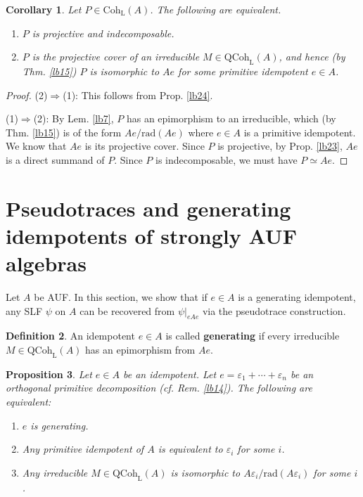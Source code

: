 \documentclass[11pt,b5paper,notitlepage]{article}
\theoremstyle{definition}
\newtheorem{df}{Definition}[section]
\theoremstyle{plain}
\newtheorem{pp}[df]{Proposition}
\newtheorem{co}[df]{Corollary}
\newcommand{\eps}{\varepsilon}
\newcommand{\QC}{\mathrm{QCoh}_{\mathrm L}}
\newcommand{\Coh}{\mathrm{Coh}_{\mathrm L}}
\newcommand{\rad}{\mathrm{rad}}
\numberwithin{equation}{section}
\begin{document}
\begin{co}\label{lb25}
Let $P\in\Coh(A)$. The following are equivalent.
\begin{enumerate}[label=(\arabic*)]
\item $P$ is projective and indecomposable.
\item $P$ is the projective cover of an irreducible $M\in\QC(A)$, and hence (by Thm. \ref{lb15}) $P$ is isomorphic to $Ae$ for some primitive idempotent $e\in A$.
\end{enumerate}
\end{co}


\begin{proof}
(2)$\Rightarrow$(1): This follows from Prop. \ref{lb24}.

(1)$\Rightarrow$(2): By Lem. \ref{lb7}, $P$ has an epimorphism to an irreducible, which (by Thm. \ref{lb15}) is of the form $Ae/\rad(Ae)$ where $e\in A$ is a primitive idempotent. We know that $Ae$ is its projective cover. Since $P$ is projective, by Prop. \ref{lb23}, $Ae$ is a direct summand of $P$. Since $P$ is indecomposable, we must have $P\simeq Ae$.
\end{proof}












\section{Pseudotraces and generating idempotents of strongly AUF algebras}

Let $A$ be AUF. In this section, we show that if $e\in A$ is a generating idempotent, any SLF $\psi$ on $A$ can be recovered from $\psi|_{eAe}$ via the pseudotrace construction. 

\begin{df}\label{lb28}
An idempotent $e\in A$ is called \textbf{generating} if every irreducible $M\in\QC(A)$ has an epimorphism from $Ae$.
\end{df}

\begin{pp}\label{lb16}
Let $e\in A$ be an idempotent. Let $e=\eps_1+\cdots+\eps_n$ be an orthogonal primitive decomposition (cf. Rem. \ref{lb14}). The following are equivalent:
\begin{enumerate}[label=(\arabic*)]
\item $e$ is generating.
\item Any primitive idempotent of $A$ is equivalent to $\eps_i$ for some $i$.
\item Any irreducible $M\in\QC(A)$ is isomorphic to $A\eps_i/\rad(A\eps_i)$ for some $i$.
\end{enumerate}
\end{pp}
\end{document}
